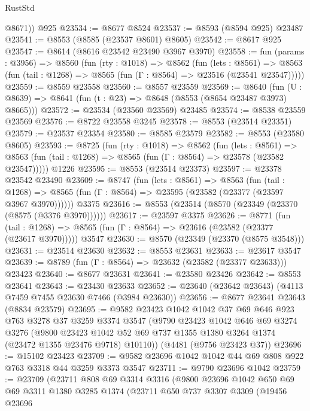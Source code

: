 \begin{lexlean}{RustStd}
\begin{coremodule}
        @8671))
    @925
@23534 := @8677 @8524
@23537 := @8593 (@8594 @925) @23487
@23541 := @8553 (@8585 (@23537 @8601) @8605)
@23542 := @8617 @925
@23547 := @8614 (@8616 @23542 @23490 @3967 @3970)
@23558 := fun (params : @3956) =>
  @8560
    (fun (rty : @1018) =>
    @8562
      (fun (lets : @8561) =>
      @8563 (fun (tail : @1268) => @8565 (fun (Γ : @8564) => @23516 (@23541 @23547)))))
@23559 := @8559 @23558
@23560 := @8557 @23559
@23569 := @8640
    (fun (U : @8639) => @8641 (fun (t : @23) => @8648 (@8553 (@8654 @23487 @3973) @8665)))
@23572 := @23534 (@23560 @23569) @23485
@23574 := @8538 @23559 @23569
@23576 := @8722 @23558 @3245
@23578 := @8553 (@23514 @23351)
@23579 := @23537 @23354
@23580 := @8585 @23579
@23582 := @8553 (@23580 @8605)
@23593 := @8725
    (fun (rty : @1018) =>
    @8562
      (fun (lets : @8561) =>
      @8563 (fun (tail : @1268) => @8565 (fun (Γ : @8564) => @23578 (@23582 @23547)))))
    @1226
@23595 := @8553 (@23514 @23373)
@23597 := @23378 @23542 @23490
@23609 := @8747
    (fun (lets : @8561) =>
    @8563
      (fun (tail : @1268) =>
      @8565 (fun (Γ : @8564) => @23595 (@23582 (@23377 (@23597 @3967 @3970))))))
    @3375
@23616 := @8553 (@23514 (@8570 (@23349 (@23370 (@8575 (@3376 @3970))))))
@23617 := @23597 @3375
@23626 := @8771
    (fun (tail : @1268) => @8565 (fun (Γ : @8564) => @23616 (@23582 (@23377 (@23617 @3970)))))
    @3547
@23630 := @8570 (@23349 (@23370 (@8575 @3548)))
@23631 := @23514 @23630
@23632 := @8553 @23631
@23633 := @23617 @3547
@23639 := @8789 (fun (Γ : @8564) => @23632 (@23582 (@23377 @23633))) @23423
@23640 := @8677 @23631
@23641 := @23580 @23426
@23642 := @8553 @23641
@23643 := @23430 @23633
@23652 := @23640 (@23642 @23643) (@4113 @7459 @7455 @23630 @7466 (@3984 @23630))
@23656 := @8677 @23641 @23643 (@8834 @23579)
@23695 := @9582
    @23423
    @1042
    @1042
    @37
    @69
    @646
    @923
    @763
    @3278
    @37
    @3259
    @3374
    @3547
    (@9790
      @23423
      @1042
      @646
      @69
      @3274
      @3276
      (@9800 @23423 @1042 @52 @69 @737 @1355 @1380 @3264 @1374 (@23472 @1355 @23476 @9718) @10110))
    (@4481 (@9756 @23423 @37))
@23696 := @15102 @23423
@23709 := @9582 @23696 @1042 @1042 @44 @69 @808 @922 @763 @3318 @44 @3259 @3373 @3547
@23711 := @9790 @23696 @1042
@23759 := @23709
    (@23711
      @808
      @69
      @3314
      @3316
      (@9800
        @23696
        @1042
        @650
        @69
        @69
        @3311
        @1380
        @3285
        @1374
        (@23711
          @650
          @737
          @3307
          @3309
          (@19456
            @23696

\end{coremodule}
\end{lexlean}
